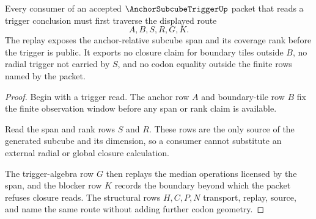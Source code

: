 \begin{theorem}
\label{thm:anchor-subcube-trigger-replay-boundary}
Every consumer of an accepted $\AnchorSubcubeTriggerUp$ packet that reads a trigger conclusion must first traverse the displayed route
$$
A,B,S,R,G,K .
$$
The replay exposes the anchor-relative subcube span and its coverage rank before the trigger is public. It exports no closure claim for boundary tiles outside $B$, no radial trigger not carried by $S$, and no codon equality outside the finite rows named by the packet.
\end{theorem}
\begin{proof}
Begin with a trigger read. The anchor row $A$ and boundary-tile row $B$ fix the finite observation window before any span or rank claim is available.

Read the span and rank rows $S$ and $R$. These rows are the only source of the generated subcube and its dimension, so a consumer cannot substitute an external radial or global closure calculation.

The trigger-algebra row $G$ then replays the median operations licensed by the span, and the blocker row $K$ records the boundary beyond which the packet refuses closure reads. The structural rows $H,C,P,N$ transport, replay, source, and name the same route without adding further codon geometry.
\end{proof}


\begin{closurestatus}{\AnchorSubcubeTriggerUp}
  \theoryclosure{\seedClosure}
  \formalstatus{\unformalizedV}
\end{closurestatus}
